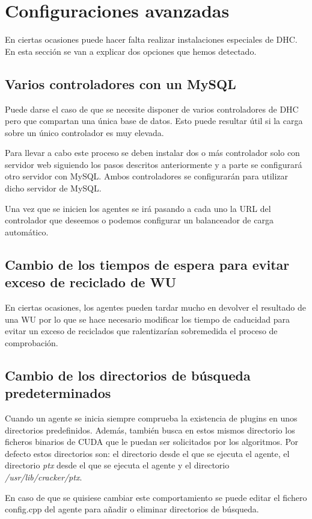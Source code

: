 
\section{Configuraciones avanzadas}\label{sec:conf_avanzada}

En ciertas ocasiones puede hacer falta realizar instalaciones especiales de DHC. En esta sección se van a explicar dos opciones que hemos detectado.

\subsection{Varios controladores con un MySQL}
Puede darse el caso de que se necesite disponer de varios controladores de DHC pero que compartan una única base de datos. Esto puede resultar útil si la carga sobre un único controlador es muy elevada.

Para llevar a cabo este proceso se deben instalar dos o más controlador solo con servidor web siguiendo los pasos descritos anteriormente y a parte se configurará otro servidor con MySQL. Ambos controladores se configurarán para utilizar dicho servidor de MySQL.

Una vez que se inicien los agentes se irá pasando a cada uno la URL del controlador que deseemos o podemos configurar un balanceador de carga automático.


\subsection{Cambio de los tiempos de espera para evitar exceso de reciclado de WU}
En ciertas ocasiones, los agentes pueden tardar mucho en devolver el resultado de una WU por lo que se hace necesario modificar los tiempo de caducidad para evitar un exceso de reciclados que ralentizarían sobremedida el proceso de comprobación.

\subsection{Cambio de los directorios de búsqueda predeterminados}
Cuando un agente se inicia siempre comprueba la existencia de plugins en unos directorios predefinidos. Además, también busca en estos mismos directorio los ficheros binarios de CUDA que le puedan ser solicitados por los algoritmos. Por defecto estos directorios son: el directorio desde el que se ejecuta el agente, el directorio \emph{ptx} desde el que se ejecuta el agente y el directorio \emph{/usr/lib/cracker/ptx}.

En caso de que se quisiese cambiar este comportamiento se puede editar el fichero config.cpp del agente para añadir o eliminar directorios de búsqueda.